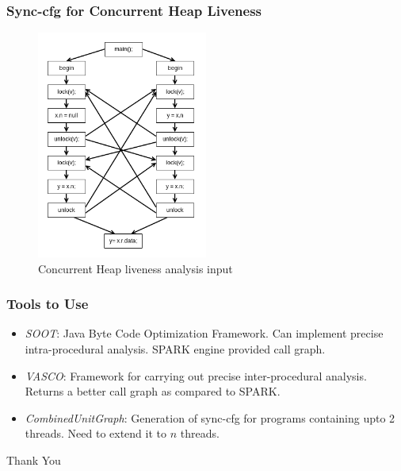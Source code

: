 \documentclass{beamer}
\begin{document}
\begin{frame}
	\frametitle{Sync-cfg for Concurrent Heap Liveness}
	\begin{figure}
		\centering
		\includegraphics[width=0.5\textwidth]{Figures/hra_live_concurrent.png}
		\caption{Concurrent Heap liveness analysis input}
		\label{fig:nullpointeranalysis}
	\end{figure}
	
\end{frame}

\begin{frame}
	\frametitle{Tools to Use}
	\begin{itemize}
		\item \emph{SOOT}: Java Byte Code Optimization Framework. Can implement precise intra-procedural analysis. SPARK engine provided call graph.
		\item \emph{VASCO}: Framework for carrying out precise inter-procedural analysis. Returns a better call graph as compared to SPARK.
		\item \emph{CombinedUnitGraph}: Generation of sync-cfg for programs containing upto 2 threads. Need to extend it to $n$ threads.
	\end{itemize}
\end{frame}

\begin{frame}

\Huge Thank You

\end{frame}
\end{document}
